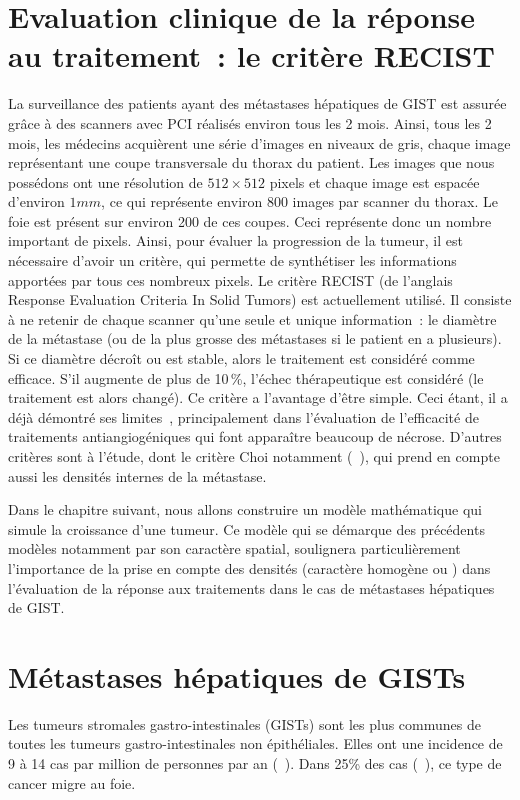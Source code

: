 \documentclass[main.tex]{subfiles}
\begin{document}
\section{Evaluation clinique de la réponse au traitement~: le critère RECIST}
La surveillance des patients ayant des métastases hépatiques de GIST est assurée grâce à des scanners avec PCI réalisés environ tous les 2 mois. Ainsi, tous les 2 mois, les médecins acquièrent une série d'images en niveaux de gris, chaque image représentant une coupe transversale du thorax du patient. Les images que nous possédons ont une résolution de $512\times512$ pixels et chaque image est espacée d'environ $1mm$, ce qui représente environ 800 images par scanner du thorax. 
Le foie est présent sur environ 200 de ces coupes. 
Ceci représente donc un nombre important de pixels. 
Ainsi, pour évaluer la progression de la tumeur, il est nécessaire d'avoir un critère, qui permette de synthétiser les informations apportées par tous ces nombreux pixels. 
Le critère RECIST (de l'anglais Response Evaluation Criteria In Solid Tumors) est actuellement utilisé. 
Il consiste à ne retenir de chaque scanner qu'une seule et unique information~: le diamètre de la métastase (ou de la plus grosse des métastases si le patient en a plusieurs). Si ce diamètre décroît ou est stable, alors le traitement est considéré comme efficace. S'il augmente de plus de 10\,\%, %
 l'échec thérapeutique est considéré %
 (le traitement est alors changé). 
 Ce critère  a l'avantage d'être simple. 
Ceci étant, il a déjà démontré ses limites~\cite{benjamin2007we,choi2007correlation}, principalement dans l'évaluation de l'efficacité de traitements antiangiogéniques qui font apparaître  beaucoup de nécrose. 
D'autres critères sont à l'étude, dont le critère Choi notamment (\cf~\cite{choi2008response,kalkmann2012consensus}), qui prend en compte aussi les densités internes de la métastase. 


Dans le chapitre suivant, nous allons construire un modèle mathématique qui simule la croissance d'une tumeur. Ce modèle qui se démarque des précédents modèles notamment par son caractère spatial, soulignera particulièrement l'importance de la prise en compte des densités (caractère homogène ou \heterogene) dans l'évaluation de la réponse aux traitements dans le cas de métastases hépatiques de GIST.

\section{Métastases hépatiques de GISTs}
Les tumeurs stromales gastro-intestinales (GISTs) sont les plus communes de toutes les tumeurs 
gastro-intestinales non épithéliales. Elles ont une incidence de 9 à 14 cas par million de personnes par an (\cf~\cite{Nilsson2005}). 
Dans 25\% des cas (\cf~\cite{dematteo2000}), ce type 
de cancer migre au foie. 
\end{document}
